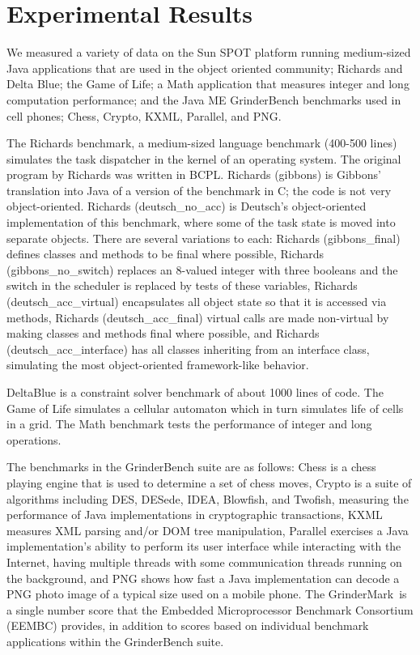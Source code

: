 \documentclass{sigplanconf}
\begin{document}
\section{Experimental Results}
\label{sec-results}

We measured a variety of data on the Sun SPOT platform running medium-sized
Java applications that are used in the object oriented community;
Richards and Delta Blue; the Game of Life; a Math application that measures
integer and long computation performance; and the Java ME GrinderBench benchmarks 
used in cell phones; Chess, Crypto, KXML, Parallel, and PNG.

The Richards benchmark, a medium-sized language benchmark (400-500 lines)
simulates the task dispatcher in the kernel of an operating system.
The original program by Richards was written in BCPL.
Richards (gibbons) is Gibbons' translation into Java of a version of the benchmark 
in C; the code is not very object-oriented.
Richards (deutsch\_no\_acc) is Deutsch's object-oriented implementation of this
benchmark, where some of the task state is moved into separate objects.
There are several variations to each: 
Richards (gibbons\_final) defines classes and methods to be final where possible, 
Richards (gibbons\_no\_switch) replaces an 8-valued integer with three booleans 
and the switch in the scheduler is replaced by tests of these variables,
Richards (deutsch\_acc\_virtual) encapsulates all object state so that it is
accessed via methods,
Richards (deutsch\_acc\_final) virtual calls are made non-virtual by making 
classes and methods final where possible, and 
Richards (deutsch\_acc\_interface) has all classes inheriting from an interface 
class, simulating the most object-oriented framework-like behavior.  

DeltaBlue is a constraint solver benchmark of about 1000 lines of code.
The Game of Life simulates a cellular automaton which in turn simulates 
life of cells in a grid.
The Math benchmark tests the performance of integer and long operations. 

The benchmarks in the GrinderBench suite are as follows: 
Chess is a chess playing engine that is used to determine a set of chess moves, 
Crypto is a suite of algorithms including DES, DESede, IDEA, Blowfish, and Twofish,
measuring the performance of Java implementations in cryptographic transactions,
KXML measures XML parsing and/or DOM tree manipulation,
Parallel exercises a Java implementation's ability to perform its user interface
while interacting with the Internet, having multiple threads with some communication
threads running on the background, and 
PNG shows how fast a Java implementation can decode a PNG photo image of a 
typical size used on a mobile phone. 
The GrinderMark\texttrademark\ is a single number score that the Embedded 
Microprocessor Benchmark Consortium (EEMBC) provides, in addition to scores 
based on individual benchmark applications within the GrinderBench suite. 
\end{document}
